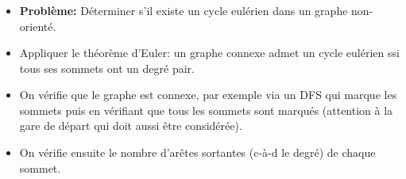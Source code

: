 \begin{frame}
    \frametitle{\problemtitle}
    \begin{itemize}
        \item<+-> \textbf{Problème:} Déterminer s'il existe un cycle eulérien dans un graphe non-orienté.
        \item<+-> Appliquer le théorème d'Euler: un graphe connexe admet un cycle eulérien ssi tous ses sommets ont un degré pair.
        \item<+-> On vérifie que le graphe est connexe, par exemple via un DFS qui marque les sommets puis en vérifiant que tous les sommets sont marqués (attention à la gare de départ qui doit aussi être considérée).
        \item<+-> On vérifie ensuite le nombre d'arêtes sortantes (c-à-d le degré) de chaque sommet.
    \end{itemize}
    \solvestats
\end{frame}
